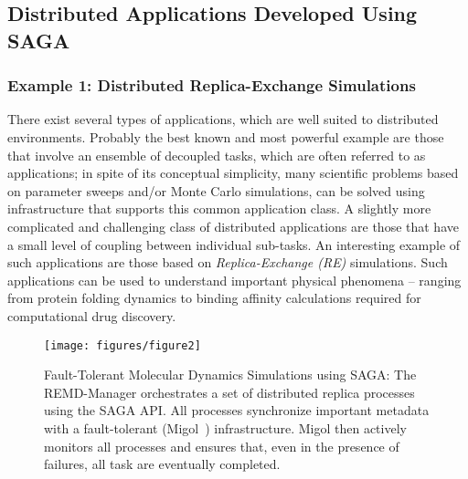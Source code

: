 \documentclass[10pt,letterpaper]{article}
\begin{document}
\subsection{Distributed Applications Developed Using SAGA}
\label{saga-apps}

\subsubsection*{Example 1: Distributed Replica-Exchange Simulations}
There exist several types of applications, which are well suited to
distributed environments. Probably the best known and most powerful
example are those that involve an ensemble of decoupled tasks, which
are often referred to as  applications; in spite of
its conceptual simplicity, many scientific problems based on parameter
sweeps and/or Monte Carlo simulations, can be solved using
infrastructure that supports this common application class. A slightly
more complicated and challenging class of distributed applications are
those that have a small level of coupling between individual
sub-tasks.  An interesting example of such applications are those
based on \emph{Replica-Exchange (RE)}
simulations.  Such applications can be used to understand important
physical phenomena -- ranging from protein folding dynamics to binding
affinity calculations required for computational drug discovery.

\begin{figure}[h]
  \texttt{[image: figures/figure2]}
  \caption{\footnotesize Fault-Tolerant Molecular Dynamics
    Simulations using SAGA: The REMD-Manager orchestrates a set of
    distributed replica processes using the SAGA API. All processes
    synchronize important metadata with a fault-tolerant (Migol~\cite{migol,Luckow:2008xy})
    infrastructure. Migol then actively monitors all processes and
    ensures that, even in the presence of failures, all task are
    eventually completed.}
  \label{fig:REMD-Manager-architecture}
\end{figure} 
\end{document}
